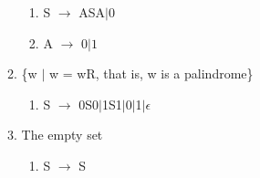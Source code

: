 \documentclass[a4paper]{article}
\begin{document}
\begin{enumerate}
\begin{enumerate}
\begin{enumerate}
        \item S $\rightarrow$ ASA$|$0

        \item A $\rightarrow$ $0|1$ \\

      \end{enumerate}

      \item \{w $|$ w = wR, that is, w is a palindrome\}
      \begin{enumerate}

        \item S $\rightarrow$ 0S0$|$1S1$|$0$|$1$|\epsilon$ \\

      \end{enumerate}

      \item The empty set
      \begin{enumerate}

        \item S $\rightarrow$ S \\

      \end{enumerate}

    \end{enumerate}


\end{enumerate}
\end{document}
